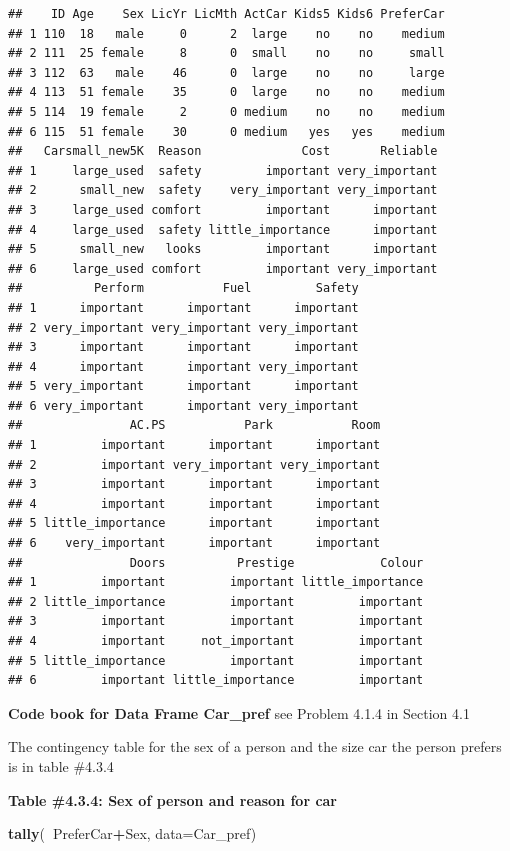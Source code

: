 \documentclass[
]{book}
\newenvironment{Shaded}{\begin{snugshade}}{\end{snugshade}}
\newcommand{\DataTypeTok}[1]{\textcolor[rgb]{0.13,0.29,0.53}{#1}}
\newcommand{\KeywordTok}[1]{\textcolor[rgb]{0.13,0.29,0.53}{\textbf{#1}}}
\newcommand{\NormalTok}[1]{#1}
\newcommand{\OperatorTok}[1]{\textcolor[rgb]{0.81,0.36,0.00}{\textbf{#1}}}
\begin{document}
\begin{verbatim}
##    ID Age    Sex LicYr LicMth ActCar Kids5 Kids6 PreferCar
## 1 110  18   male     0      2  large    no    no    medium
## 2 111  25 female     8      0  small    no    no     small
## 3 112  63   male    46      0  large    no    no     large
## 4 113  51 female    35      0  large    no    no    medium
## 5 114  19 female     2      0 medium    no    no    medium
## 6 115  51 female    30      0 medium   yes   yes    medium
##   Carsmall_new5K  Reason              Cost       Reliable
## 1     large_used  safety         important very_important
## 2      small_new  safety    very_important very_important
## 3     large_used comfort         important      important
## 4     large_used  safety little_importance      important
## 5      small_new   looks         important      important
## 6     large_used comfort         important very_important
##          Perform           Fuel         Safety
## 1      important      important      important
## 2 very_important very_important very_important
## 3      important      important      important
## 4      important      important very_important
## 5 very_important      important      important
## 6 very_important      important very_important
##               AC.PS           Park           Room
## 1         important      important      important
## 2         important very_important very_important
## 3         important      important      important
## 4         important      important      important
## 5 little_importance      important      important
## 6    very_important      important      important
##               Doors          Prestige            Colour
## 1         important         important little_importance
## 2 little_importance         important         important
## 3         important         important         important
## 4         important     not_important         important
## 5 little_importance         important         important
## 6         important little_importance         important
\end{verbatim}

\textbf{Code book for Data Frame Car\_pref} see Problem 4.1.4 in Section 4.1

The contingency table for the sex of a person and the size car the person prefers is in table \#4.3.4

\textbf{Table \#4.3.4: Sex of person and reason for car}

\begin{Shaded}
\begin{Highlighting}[]
\KeywordTok{tally}\NormalTok{(}\OperatorTok{~}\NormalTok{PreferCar}\OperatorTok{+}\NormalTok{Sex, }\DataTypeTok{data=}\NormalTok{Car_pref)}
\end{Highlighting}
\end{Shaded}
\end{document}
